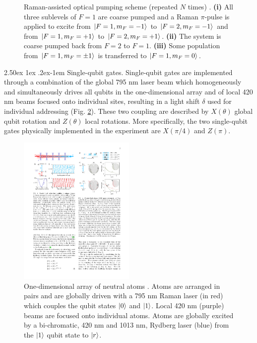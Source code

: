\documentclass[rmp,10pt,onecolumn,fleqn,notitlepage]{revtex4-1}
\makeatletter
\renewcommand{\paragraph}{%
    \@startsection{paragraph}{4}%
    {\z@}{2.50ex \@plus 1ex \@minus .2ex}{-1em}%
    {\bf\sffamily}%
}
\makeatother
\begin{document}
\begin{figure}[H]
\begin{minipage}{0.45\linewidth}
    \caption{ Raman-assisted optical pumping scheme (repeated $N$ times) \cite{PhysRevLett.123.170503}. \textbf{(i)} All three sublevels of $F=1$ are coarse pumped and a Raman $\pi$-pulse is applied to excite from $\left\vert{F=1,m_F=-1}\right\rangle$ to $\left\vert{F=2,m_F=-1}\right\rangle$ and from $\left\vert{F=1,m_F=+1}\right\rangle$ to $\left\vert{F=2,m_F=+1}\right\rangle$. \textbf{(ii)} The system is coarse pumped back from $F=2$ to $F=1$. \textbf{(iii)} Some population from $\left\vert{F=1,m_F=\pm 1}\right\rangle$ is transferred to $\left\vert{F=1,m_F=0}\right\rangle$.  }
    \label{fig:raman-optical-pumping}
    \end{minipage}
\end{figure}

\paragraph{Single-qubit gates.} Single-qubit gates are implemented through a combination of the global 795 nm laser beam which homogeneously and simultaneously drives all qubits in the one-dimensional array and of local 420 nm beams focused onto individual sites, resulting in a light shift $\delta$ used for individual addressing (Fig. \ref{fig:one-dimensional-array}). These two coupling are described by $X(\theta)$ global qubit rotation and $Z(\theta)$ local rotations. More specifically, the two single-qubit gates physically implemented in the experiment are $X(\pi/4)$ and $Z(\pi)$.
	
	\begin{figure}[h!]
	    \centering
	    \includegraphics[width=0.5\textwidth]{image/physical_implementation/one-dimensional-array.pdf}
	    \caption{One-dimensional array of neutral atoms \cite{PhysRevLett.123.170503}. Atoms are arranged in pairs and are globally driven with a 795 nm Raman laser (in red) which couples the qubit states $\left\vert{0}\right\rangle$ and $\left\vert{1}\right\rangle$. Local 420 nm (purple) beams are focused onto individual atoms. Atoms are globally excited by a bi-chromatic, 420 nm and 1013 nm, Rydberg laser (blue) from the $\left\vert{1}\right\rangle$ qubit state to $\left\vert{r}\right\rangle$. }
	    \label{fig:one-dimensional-array}
	\end{figure}
\end{document}
